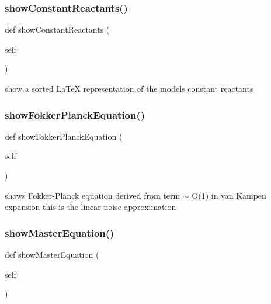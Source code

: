 \subsubsection{\texorpdfstring{show\+Constant\+Reactants()}{showConstantReactants()}}
{\footnotesize\ttfamily def show\+Constant\+Reactants (\begin{DoxyParamCaption}\item[{}]{self }\end{DoxyParamCaption})}



show a sorted La\+TeX representation of the model\textquotesingle{}s constant reactants 

\mbox{\label{class_mu_mo_t_1_1_mu_mo_t_1_1_mu_mo_tmodel_a999055f8c8e7e3107eb127e2a3122100}} 
\subsubsection{\texorpdfstring{show\+Fokker\+Planck\+Equation()}{showFokkerPlanckEquation()}}
{\footnotesize\ttfamily def show\+Fokker\+Planck\+Equation (\begin{DoxyParamCaption}\item[{}]{self }\end{DoxyParamCaption})}



shows Fokker-\/\+Planck equation derived from term $\sim$ O(1) in van Kampen expansion this is the linear noise approximation 

\mbox{\label{class_mu_mo_t_1_1_mu_mo_t_1_1_mu_mo_tmodel_a2d73fce0efa141df05f6d5e14959a135}} 
\subsubsection{\texorpdfstring{show\+Master\+Equation()}{showMasterEquation()}}
{\footnotesize\ttfamily def show\+Master\+Equation (\begin{DoxyParamCaption}\item[{}]{self }\end{DoxyParamCaption})}



